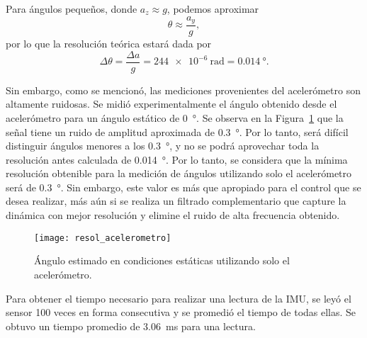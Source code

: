 Para ángulos pequeños, donde $a_z \approx g$, podemos aproximar
$$\theta \approx \frac{a_y}{g},$$
por lo que la resolución teórica estará dada por
$$\Delta \theta = \frac{\Delta a}{g} = \qty{244e-6}{\radian} = \qty{0.014}{\degree}.$$

Sin embargo, como se mencionó, las mediciones provenientes del acelerómetro son altamente ruidosas. Se midió experimentalmente el ángulo obtenido desde el acelerómetro para un ángulo estático de \qty{0}{\degree}. Se observa en la Figura~\ref{fig:ruido-acel} que la señal tiene un ruido de amplitud aproximada de \qty{0.3}{\degree}. Por lo tanto, será difícil distinguir ángulos menores a los \qty{0.3}{\degree}, y no se podrá aprovechar toda la resolución antes calculada de \qty{0.014}{\degree}. Por lo tanto, se considera que la mínima resolución obtenible para la medición de ángulos utilizando solo el acelerómetro será de \qty{0.3}{\degree}. Sin embargo, este valor es más que apropiado para el control que se desea realizar, más aún si se realiza un filtrado complementario que capture la dinámica con mejor resolución y elimine el ruido de alta frecuencia obtenido.

\begin{figure}[!tbp]
    \centering
    \texttt{[image: resol\_acelerometro]}
    \caption{Ángulo estimado en condiciones estáticas utilizando solo el acelerómetro.}
    \label{fig:ruido-acel}
\end{figure}

Para obtener el tiempo necesario para realizar una lectura de la IMU, se leyó el sensor 100 veces en forma consecutiva y se promedió el tiempo de todas ellas. Se obtuvo un tiempo promedio de \qty{3.06}{\ms} para una lectura.

